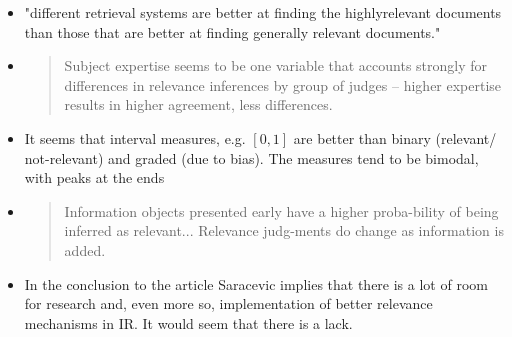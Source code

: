 \documentclass{article}
\begin{document}
\begin{itemize}
\item "different  retrieval  systems  are  better  at  finding  the  highlyrelevant documents than those that are better at finding generally relevant documents."

\item 
    \begin{quote}
    Subject  expertise  seems  to  be  one  variable  that  accounts strongly for differences in relevance inferences by group of judges -- higher  expertise results  in  higher  agreement, less differences.
    \end{quote}

\item {}  It seems that interval measures, e.g. $[0,1]$ are better than binary (relevant/ not-relevant) and graded (due to bias).  The measures tend to be bimodal, with peaks at the ends 

\item {}
    \begin{quote}
        Information objects presented early have a higher proba-bility of being inferred as relevant...  Relevance judg-ments do change as information is added.
    \end{quote}

\item {}  In the conclusion to the article Saracevic implies that there is a lot of room for research and, even more so, implementation of better relevance mechanisms in IR.  It would seem that there is a lack.

\end{itemize}

\end{document}
